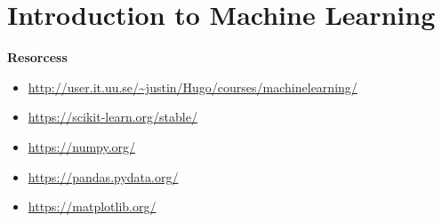 \chapter{Introduction to Machine Learning}

\textbf{Resorcess}
\begin{itemize}
    \item \url{http://user.it.uu.se/~justin/Hugo/courses/machinelearning/}
    \item \url{https://scikit-learn.org/stable/}
    \item \url{https://numpy.org/}
    \item \url{https://pandas.pydata.org/}
    \item \url{https://matplotlib.org/}
\end{itemize}

\newpage


